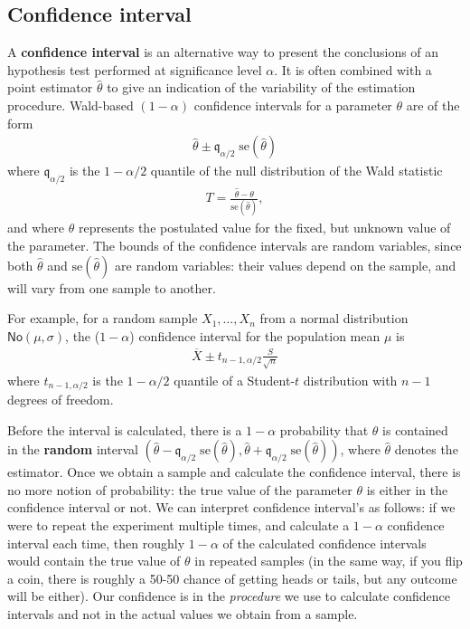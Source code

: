 \documentclass[
  11pt,
  letterpaper,
]{book}
\theoremstyle{definition}
\theoremstyle{definition}
\theoremstyle{definition}
\theoremstyle{remark}
\begin{document}
\hypertarget{confidence-interval}{%
\subsection{Confidence interval}\label{confidence-interval}}

A \textbf{confidence interval} is an alternative way to present the conclusions of an hypothesis test performed at significance level \(\alpha\). It is often combined with a point estimator \(\hat{\theta}\) to give an indication of the variability of the estimation procedure. Wald-based \((1-\alpha)\) confidence intervals for a parameter \(\theta\) are of the form
\begin{align*}
\widehat{\theta} \pm \mathfrak{q}_{\alpha/2} \; \mathrm{se}(\widehat{\theta})
\end{align*}
where \(\mathfrak{q}_{\alpha/2}\) is the \(1-\alpha/2\) quantile of the null distribution of the Wald statistic
\begin{align*}
T =\frac{\widehat{\theta}-\theta}{\mathrm{se}(\widehat{\theta})},
\end{align*}
and where \(\theta\) represents the postulated value for the fixed, but unknown value of the parameter. The bounds of the confidence intervals are random variables, since both \(\widehat{\theta}\) and \(\mathrm{se}(\widehat{\theta})\) are random variables: their values depend on the sample, and will vary from one sample to another.

For example, for a random sample \(X_1, \ldots, X_n\) from a normal distribution \(\mathsf{No}(\mu, \sigma)\), the (\(1-\alpha\)) confidence interval for the population mean \(\mu\) is
\begin{align*}
\overline{X} \pm t_{n-1, \alpha/2} \frac{S}{\sqrt{n}}
\end{align*}
where \(t_{n-1,\alpha/2}\) is the \(1-\alpha/2\) quantile of a Student-\(t\) distribution with \(n-1\) degrees of freedom.

Before the interval is calculated, there is a \(1-\alpha\) probability that \(\theta\) is contained in the \textbf{random} interval \((\widehat{\theta} - \mathfrak{q}_{\alpha/2} \; \mathrm{se}(\widehat{\theta}), \widehat{\theta} + \mathfrak{q}_{\alpha/2} \; \mathrm{se}(\widehat{\theta}))\), where \(\widehat{\theta}\) denotes the estimator. Once we obtain a sample and calculate the confidence interval, there is no more notion of probability: the true value of the parameter \(\theta\) is either in the confidence interval or not. We can interpret confidence interval's as follows: if we were to repeat the experiment multiple times, and calculate a \(1-\alpha\) confidence interval each time, then roughly \(1-\alpha\) of the calculated confidence intervals would contain the true value of \(\theta\) in repeated samples (in the same way, if you flip a coin, there is roughly a 50-50 chance of getting heads or tails, but any outcome will be either). Our confidence is in the \emph{procedure} we use to calculate confidence intervals and not in the actual values we obtain from a sample.
\end{document}
